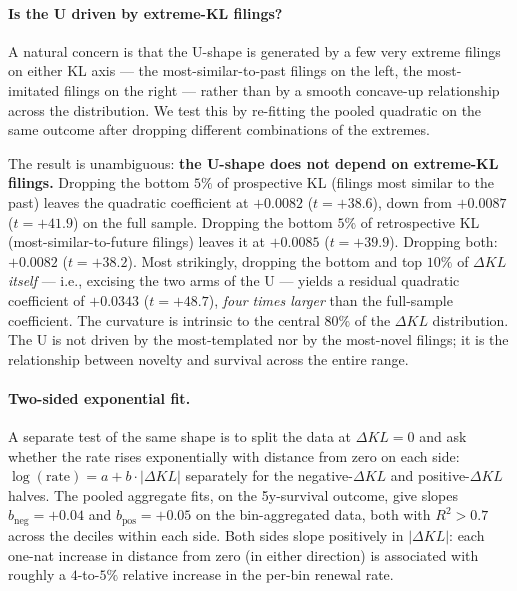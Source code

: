 \documentclass[11pt]{article}
\begin{document}
\paragraph{Is the U driven by extreme-KL filings?}
A natural concern is that the U-shape is generated by a few very
extreme filings on either KL axis --- the most-similar-to-past
filings on the left, the most-imitated filings on the right ---
rather than by a smooth concave-up relationship across the
distribution. We test this by re-fitting the pooled quadratic on
the same outcome after dropping different combinations of the
extremes.

\begin{table}[h]
\centering
\caption{Pooled quadratic logit of 5y survival on $z(\Delta KL)$
and $z(\Delta KL)^2$, with year and year-squared controls,
re-fit after dropping different parts of the sample. The
quadratic coefficient on $\Delta KL^2$ is essentially unchanged
across drop choices --- the U-shape is a property of the central
distribution, not of the extreme tails.}
\label{tab:u-shape-drilldown}

\end{table}

The result is unambiguous: \textbf{the U-shape does not depend on
extreme-KL filings.} Dropping the bottom $5\%$ of prospective KL
(filings most similar to the past) leaves the quadratic
coefficient at $+0.0082$ ($t = +38.6$), down from $+0.0087$
($t = +41.9$) on the full sample. Dropping the bottom $5\%$ of
retrospective KL (most-similar-to-future filings) leaves it at
$+0.0085$ ($t = +39.9$). Dropping both: $+0.0082$ ($t = +38.2$).
Most strikingly, dropping the bottom and top $10\%$ of $\Delta KL$
\emph{itself} --- i.e., excising the two arms of the U --- yields
a residual quadratic coefficient of $+0.0343$ ($t = +48.7$),
\emph{four times larger} than the full-sample coefficient. The
curvature is intrinsic to the central $80\%$ of the $\Delta KL$
distribution. The U is not driven by the most-templated nor by
the most-novel filings; it is the relationship between novelty and
survival across the entire range.

\paragraph{Two-sided exponential fit.}
A separate test of the same shape is to split the data at
$\Delta KL = 0$ and ask whether the rate rises exponentially with
distance from zero on each side: $\log(\text{rate}) = a + b \cdot
|\Delta KL|$ separately for the negative-$\Delta KL$ and
positive-$\Delta KL$ halves. The pooled aggregate fits, on the
5y-survival outcome, give slopes $b_{\text{neg}} = +0.04$ and
$b_{\text{pos}} = +0.05$ on the bin-aggregated data, both with
$R^2 > 0.7$ across the deciles within each side. Both sides slope
positively in $|\Delta KL|$: each one-nat increase in distance
from zero (in either direction) is associated with roughly a
$4$-to-$5\%$ relative increase in the per-bin renewal rate.
\end{document}
